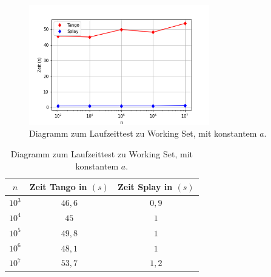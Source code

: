 \documentclass[a4paper,12pt]{article}
\begin{document}
\begin{figure}[H]
	\centering
	\includegraphics[width=0.7\textwidth]{Medien/laufzeittest/diagramm/workingset}
	\caption{Diagramm zum Laufzeittest zu Working Set, mit konstantem $a$.}
\end{figure}
\begin{table}[H]
	\begin{center}
		\begin{tabular}[c]{|c|c|c|}
			\hline
			$n$ & Zeit Tango in $\left(s\right)$ &Zeit Splay in $\left(s\right)$ \\
			\hline
			$10^3$ & $46,6$ &$0,9$ \\
			\hline
			$10^4$  & $45$ &$1$  \\
			\hline
			$10^5$  & $49,8$ &$1$  \\
			\hline
			$10^6$  & $48,1$ &$1$  \\
			\hline
			$10^7$  & $53,7$ &$1,2$  \\
			\hline
		\end{tabular}
		\caption{Diagramm zum Laufzeittest zu Working Set, mit konstantem $a$.} 
	\end{center}
\end{table}
\end{document}

